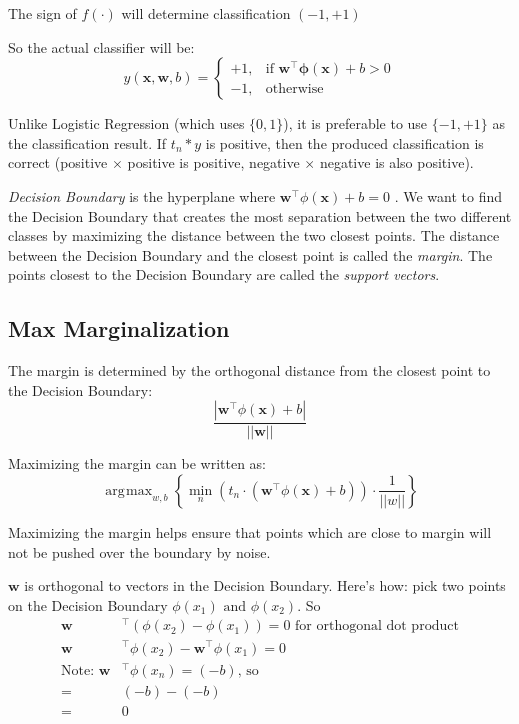 \documentclass[11pt, oneside]{article}   	%
\DeclareMathOperator*{\argmax}{\arg\!\max}
\begin{document}
The sign of $f(\cdot)$ will determine classification $(-1,+1)$

So the actual classifier will be:
\[
y(\textbf{x},\textbf{w},b) =
	\begin{cases}
	  	+1, &\text{if  }\textbf{w}^\intercal \mathbf{\phi}(\textbf{x}) + b > 0 \\
		-1, &\text{otherwise}
	\end{cases}
\]

Unlike Logistic Regression (which uses $\{0, 1\}$), it is preferable to use $\{-1, +1\}$ as the classification result. If $t_n * y$ is positive, then the produced classification is correct (positive $\times$ positive is positive, negative $\times$ negative is also positive).

\emph{Decision Boundary} is the hyperplane where $\textbf{w}^\intercal \phi(\textbf{x}) +b = 0$ . We want to find the Decision Boundary that creates the most separation between the two different classes by maximizing the distance between the two closest points. The distance between the Decision Boundary and the closest point is called the \emph{margin}. The points closest to the Decision Boundary are called the \emph{support vectors}.

\subsection {Max Marginalization}

The margin is determined by the orthogonal distance from the closest point to the Decision Boundary: 
\begin{equation}
\frac{|\textbf{w}^\intercal \phi(\textbf{x}) + b|}{||\textbf{w}||}
\end{equation}


Maximizing the margin can be written as:
\begin{equation}
\argmax_{w,b} \left\{\min_n(t_n\cdot(\mathbf{w}^\intercal\phi(\mathbf{x})+b))\cdot\frac{1}{||w||} \right\}
\end{equation}

Maximizing the margin helps ensure that points which are close to margin will not be pushed over the boundary by noise.

$\mathbf{w}$ is orthogonal to vectors in the Decision Boundary. Here's how: pick two points on the Decision Boundary $\phi(x_1) \text{ and } \phi(x_2)$. So
\begin{align}
\mathbf{w}&^\intercal\left(\phi(x_2) - \phi(x_1)\right) = 0 \text{ for orthogonal dot product}\nonumber \\
\mathbf{w}&^\intercal\phi(x_2) - \mathbf{w}^\intercal\phi(x_1) = 0 \nonumber \\
\text{Note: } \mathbf{w}&^\intercal\phi(x_n) = (-b) \text{, so} \nonumber \\
=&(-b) - (-b) \nonumber \\
=& 0 \nonumber
\end{align}
\end{document}
